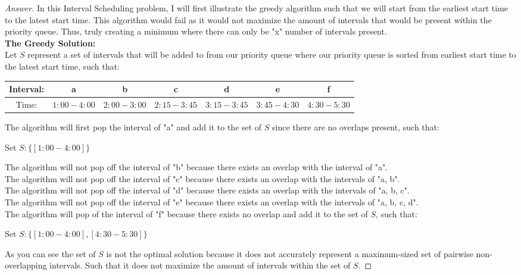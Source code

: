 \documentclass[11pt]{article}
\theoremstyle{definition}
\theoremstyle{definition}
\theoremstyle{definition}
\begin{document}
\begin{proof}[Answer]
In this Interval Scheduling problem, I will first illustrate the greedy algorithm such that we will start from the earliest start time to the latest start time. This algorithm would fail as it would not maximize the amount of intervals that would be present within the priority queue. Thus, truly creating a minimum where there can only be "x" number of intervals present. \\

\textbf {The Greedy Solution:}\\
Let $S$ represent a set of intervals that will be added to from our priority queue where our priority queue is sorted from earliest start time to the latest start time, such that: \\
\begin{center}
\begin{tabular}{ | c | c | c | c | c | c | c | }
 \hline
 Interval:& a & b & c & d & e & f\\  
 \hline
 Time: & $1:00 - 4:00$ & $2:00 - 3:00$ & $2:15 - 3:45$ & $3:15 - 3:45$ & $3:45 - 4:30$ & $4:30 - 5:30$\\
  \hline
\end{tabular}
\end{center}
The algorithm will first pop the interval of "a" and add it to the set of $S$ since there are no overlaps present, such that: \\
\begin{center}
Set $S: \{[1:00 - 4: 00]\}$\\
\end{center}

The algorithm will not pop off the interval of "b" because there exists an overlap with the interval of "a". \\
The algorithm will not pop off the interval of "c" because there exists an overlap with the intervals of "a, b". \\
The algorithm will not pop off the interval of "d" because there exists an overlap with the intervals of "a, b, c". \\
The algorithm will not pop off the interval of "e" because there exists an overlap with the intervals of "a, b, c, d". \\

The algorithm will pop of the interval of "f" because there exists no overlap and add it to the set of $S$, such that: \\
\begin{center}
Set $S: \{[1:00 - 4: 00], [4:30 - 5:30]\}$\\
\end{center}
As you can see the set of $S$ is not the optimal solution because it does not accurately represent a maximum-sized set of pairwise non-overlapping intervals. Such that it does not maximize the amount of intervals within the set of $S$.
\end{proof}
\end{document}
